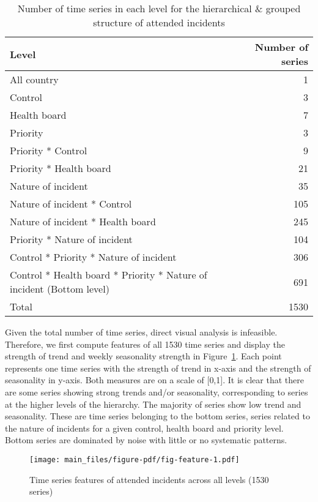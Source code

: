 \documentclass[
  authoryear,
  preprint,
  3p]{elsarticle}
\begin{document}
\hypertarget{tbl-hierarchy}{}
\begin{table}
\caption{\label{tbl-hierarchy}Number of time series in each level for the hierarchical \& grouped
structure of attended incidents }\tabularnewline

\centering
\begin{tabular}{lr}
\toprule
Level & Number of series\\
\midrule
All country & 1\\
Control & 3\\
Health board & 7\\
Priority & 3\\
Priority * Control & 9\\
\addlinespace
Priority * Health board & 21\\
Nature of incident & 35\\
Nature of incident * Control & 105\\
Nature of incident * Health board & 245\\
Priority * Nature of incident & 104\\
\addlinespace
Control * Priority * Nature of incident & 306\\
Control * Health board * Priority * Nature of incident (Bottom level) & 691\\
Total & 1530\\
\bottomrule
\end{tabular}
\end{table}

Given the total number of time series, direct visual analysis is
infeasible. Therefore, we first compute features of all 1530 time series
\citep{m3pca} and display the strength of trend and weekly seasonality
strength in Figure~\ref{fig-feature}. Each point represents one time
series with the strength of trend in x-axis and the strength of
seasonality in y-axis. Both measures are on a scale of {[}0,1{]}. It is
clear that there are some series showing strong trends and/or
seasonality, corresponding to series at the higher levels of the
hierarchy. The majority of series show low trend and seasonality. These
are time series belonging to the bottom series, series related to the
nature of incidents for a given control, health board and priority
level. Bottom series are dominated by noise with little or no systematic
patterns.

\begin{figure}

{\centering \texttt{[image: main\_files/figure-pdf/fig-feature-1.pdf]}

}

\caption{\label{fig-feature}Time series features of attended incidents
across all levels (1530 series)}

\end{figure}
\end{document}
